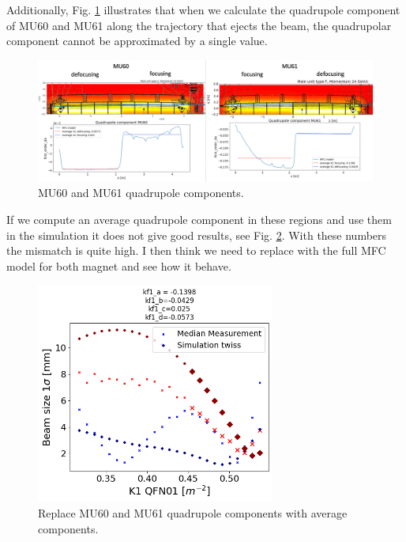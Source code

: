 Additionally, Fig. \ref{fig:mu60_mu61_q_comp} illustrates that when we calculate the quadrupole component of MU60 and MU61 along the trajectory that ejects the beam, the quadrupolar component cannot be approximated by a single value.

\begin{figure}[H]
\centering
\includegraphics[width=1.0\textwidth]{02_Simulation/images/mu60_mu61_quad_comp.png}
\caption{MU60 and MU61 quadrupole components.}
\label{fig:mu60_mu61_q_comp}
\end{figure}

If we compute an average quadrupole component in these regions and use them in the simulation it does not give good results, see Fig. \ref{fig:replace_with_average}. With these numbers the mismatch is quite high. I then think we need to replace with the full MFC model for both magnet and see how it behave.

\begin{figure}[H]
\centering
\includegraphics[width=0.7\textwidth]{02_Simulation/images/Replace MU60 and MU61 with stray field-2.png}
\caption{Replace MU60 and MU61 quadrupole components with average components.}
\label{fig:replace_with_average}
\end{figure}

